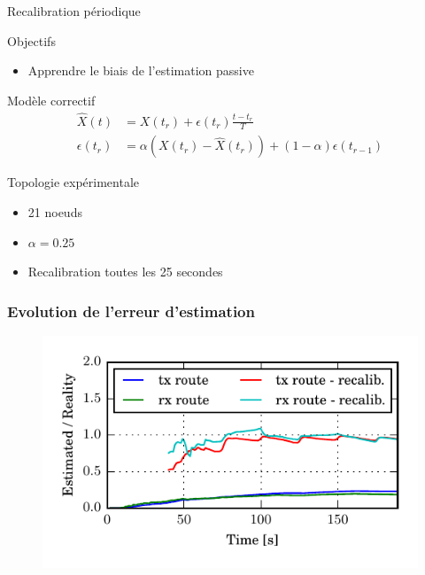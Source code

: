\begin{frame}{Recalibration périodique}
  \begin{block}{Objectifs}
    \begin{itemize}
      \item Apprendre le biais de l'estimation passive
    \end{itemize}
  \end{block}
  \begin{alertblock}{Modèle correctif}
    \begin{align}
      \widehat{X}(t) &= X(t_r) + \epsilon(t_r)\frac{t - t_r}{T}\\
      \epsilon(t_r) &= \alpha (X(t_r) - \widehat{X}(t_r)) + (1 - \alpha)\epsilon(t_{r-1})
      \label{supervision:eqn:bias}
    \end{align}
  \end{alertblock}
  \begin{block}{Topologie expérimentale}
    \begin{itemize}
      \item 21 noeuds
      \item $\alpha = 0.25$
      \item Recalibration toutes les 25 secondes
    \end{itemize}
  \end{block}
\end{frame}

\begin{frame}\frametitle{Evolution de l'erreur d'estimation}
  \begin{figure}[ht]
    \centering
    \includegraphics[width=\textwidth]{figures/ratio_recalibration_global.pdf}
  \end{figure}
\end{frame}


